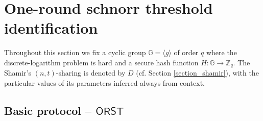 \documentclass[psamsfonts, reqno]{amsart}
\theoremstyle{definition}
\theoremstyle{remark}
\numberwithin{equation}{section}
\begin{document}
\section{One-round schnorr threshold identification}\label{section_protocols}

\noindent
Throughout this section we fix
a cyclic group $\mathbb{G} = \langle g \rangle$ of order $q$
where the discrete-logarithm problem is hard and
a secure hash function $H: \mathbb{G} \rightarrow \mathbb{Z}_q$.
The Shamir's $(n, t)$-sharing is denoted by $D$
(cf. Section \ref{section_shamir}), with the particular values
of its parameters inferred always from context.

\subsection{Basic protocol -- $\mathsf{ORST}$}
\end{document}
